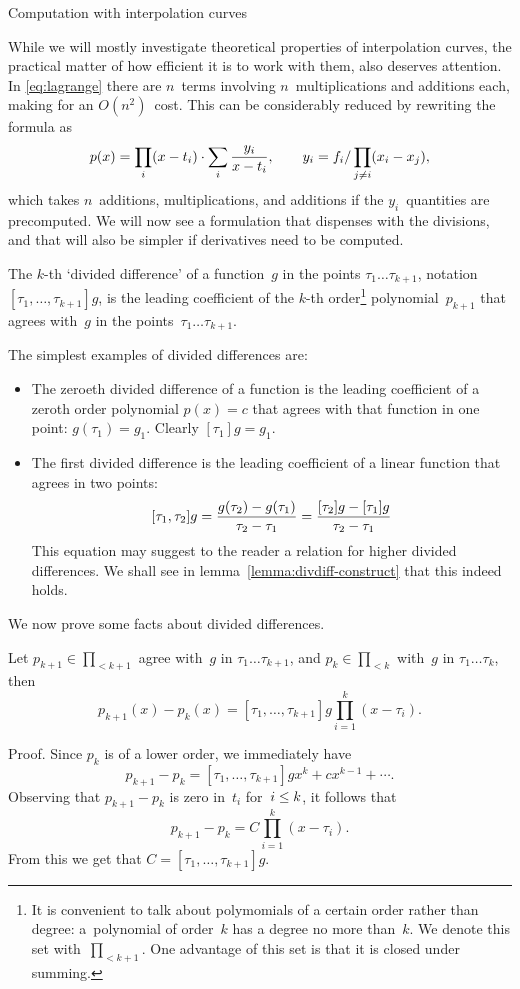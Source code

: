  {Computation with interpolation curves}

While we will mostly investigate theoretical properties of
interpolation curves, the practical matter of how efficient it is to
work with them, also deserves attention. In \eqref{eq:lagrange} there
are $n$~terms involving $n$~multiplications and additions each, making
for an $O(n^2)$~cost. This can be considerably reduced by rewriting
the formula as
\[ p(x) = \prod_i(x-t_i)\cdot\sum_i{y_i\over x-t_i},
    \qquad y_i=f_i/\prod_{j\not=i}(x_i-x_j),
\]
which takes $n$~additions, multiplications, and additions if the
$y_i$~quantities are precomputed. We will now see a formulation that
dispenses with the divisions, and that will also be simpler if
derivatives need to be computed.

\newcommand\kdd[1]{\kddl{1}{#1}}
\newcommand\kddl[2]{[\tau_{#1},\ldots,\tau_{#2}]}

The $k$-th
`divided difference' of a function~$g$ in
the points $\tau_1\ldots\tau_{k+1}$, notation $\kdd{k+1}g$, is the
leading coefficient of the $k$-th order\footnote{It is convenient to
  talk about polymomials of a certain order rather than degree:
  a~polynomial of order~$k$ has a degree no more than~$k$. We denote
  this set with~$\prod_{<k+1}$. One advantage of this set is that it
  is closed under summing.}  polynomial~$p_{k+1}$ that agrees with~$g$
in the points~$\tau_1\ldots\tau_{k+1}$.

The simplest examples of divided differences are:
\begin{itemize}
\item The zeroeth divided difference of a function is the leading
  coefficient of a zeroth order polynomial $p(x)=c$ that agrees with
  that function in one point: $g(\tau_1)=g_1$. Clearly $[\tau_1]g=g_1$.
\item The first divided difference is the leading coefficient of a
  linear function that agrees in two points:
\[ [\tau_1,\tau_2]g={g(\tau_2)-g(\tau_1)\over \tau_2-\tau_1}
    ={[\tau_2]g-[\tau_1]g\over \tau_2-\tau_1}
\]
This equation may suggest to the reader a relation for higher divided
differences. We shall see in lemma~\ref{lemma:divdiff-construct} that
this indeed holds.
\end{itemize}

We now prove some facts about divided differences.
\begin{lemma}\label{lemma:pk-diff}
Let $p_{k+1}\in\prod_{<k+1}$ agree with~$g$ in
$\tau_1\ldots\tau_{k+1}$, and $p_k\in\prod_{<k}$ with~$g$ in
$\tau_1\ldots\tau_k$, then
\begin{equation}
    p_{k+1}(x)-p_k(x)=\kdd{k+1}g\prod_{i=1}^k(x-\tau_i).
    \label{eq:pk-diff}
\end{equation}
\end{lemma}
Proof. Since $p_k$ is of a lower order, we immediately have
\[ p_{k+1}-p_k=\kdd{k+1}gx^k+cx^{k-1}+\cdots.\]
Observing that $p_{k+1}-p_k$ is zero in~$t_i$ for~$i\leq\nobreak k$,
it follows that
\[ p_{k+1}-p_k=C\prod_{i=1}^k(x-\tau_i). \]
From this we get that $C=\kdd{k+1}g$.\endproof

